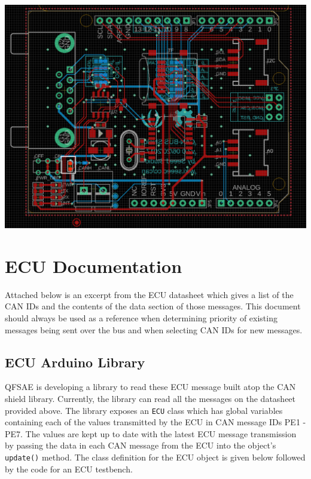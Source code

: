 \documentclass[letterpaper]{article}
\begin{document}
\begin{center}
  \includegraphics[width=\textwidth]{terminating-resistor}
\end{center}

\section{ECU Documentation}
Attached below is an excerpt from the ECU datasheet which
gives a list of the CAN IDs and the contents of the data section of those
messages. This document should always be used as a reference when determining
priority of existing messages being sent over the bus and when selecting CAN IDs
for new messages.\\



\subsection{ECU Arduino Library}
QFSAE is developing a library to read these ECU message built atop the
CAN shield library. Currently, the library can read all the messages on 
the datasheet provided above. The library exposes an \lstinline{ECU} class
which has global variables containing each of the values transmitted by
the ECU in CAN message IDs PE1 - PE7. The values are kept up to date with the
latest ECU message transmission by passing the data in each CAN message from the
ECU into the object's \lstinline{update()} method. The class definition for the
ECU object is given below followed by the code for an ECU testbench.\\
\end{document}
